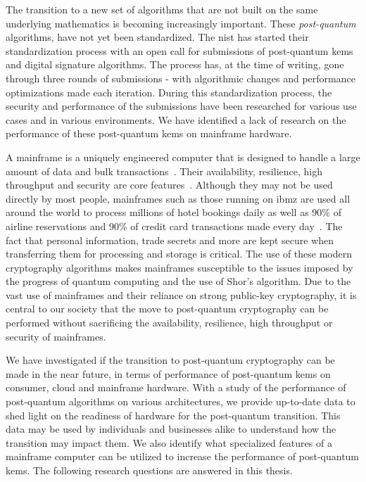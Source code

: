 The transition to a new set of algorithms that are not built on the same underlying mathematics is becoming increasingly important. These \textit{\gls{post-quantum}} algorithms, have not yet been standardized. The \acrfull{nist} has started their standardization process with an open call for submissions of \gls{post-quantum} \glspl{kem} and digital signature algorithms. The process has, at the time of writing, gone through three rounds of submissions - with algorithmic changes and performance optimizations made each iteration. During this standardization process, the security and performance of the submissions have been researched for various use cases and in various environments. We have identified a lack of research on the performance of these \gls{post-quantum} \glspl{kem} on mainframe hardware.

A mainframe is a uniquely engineered computer that is designed to handle a large amount of data and bulk transactions~\cite{mainframes}. Their availability, resilience, high throughput and security are core features~\cite{mainframes}. Although they may not be used directly by most people, mainframes such as those running on \gls{ibmz} are used all around the world to process millions of hotel bookings daily as well as 90\% of airline reservations and 90\% of credit card transactions made every day~\cite{jacobi2020}. The fact that personal information, trade secrets and more are kept secure when transferring them for processing and storage is critical. The use of these modern cryptography algorithms makes mainframes susceptible to the issues imposed by the progress of quantum computing and the use of Shor's algorithm. Due to the vast use of mainframes and their reliance on strong public-key cryptography, it is central to our society that the move to \gls{post-quantum} cryptography can be performed without sacrificing the availability, resilience, high throughput or security of mainframes.

We have investigated if the transition to \gls{post-quantum} cryptography can be made in the near future, in terms of performance of \gls{post-quantum} \glspl{kem} on consumer, cloud and mainframe hardware. With a study of the performance of \gls{post-quantum} algorithms on various architectures, we provide up-to-date data to shed light on the readiness of hardware for the \gls{post-quantum} transition. This data may be used by individuals and businesses alike to understand how the transition may impact them. We also identify what specialized features of a mainframe computer can be utilized to increase the performance of \gls{post-quantum} \glspl{kem}. The following research questions are answered in this thesis.

